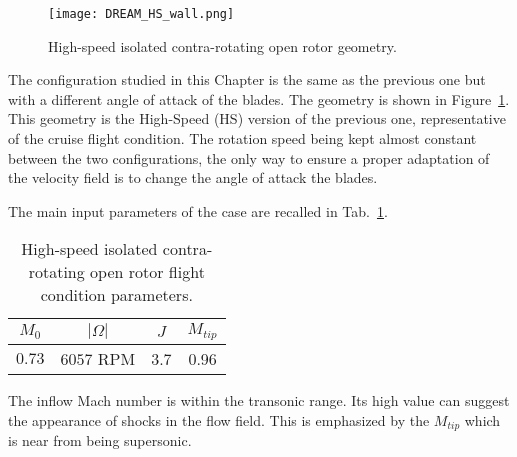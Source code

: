 
\begin{figure}[htp]
  \centering
  \texttt{[image: DREAM\_HS\_wall.png]}
  \caption{High-speed isolated contra-rotating open rotor geometry.}
  \label{fig:dream_hs_wall}
\end{figure}

The configuration studied in this Chapter is the same as the
previous one but with a different angle of attack of
the blades. The geometry is shown in Figure~\ref{fig:dream_hs_wall}.
This geometry is the High-Speed (HS) version of the previous one, 
representative of the cruise flight condition. The rotation speed being kept
almost constant between the two configurations, the only way to ensure
a proper adaptation of the velocity field is to change the angle of 
attack the blades.

The main input parameters of the case are recalled in
Tab.~\ref{tab:dream_hs_flight_condition}.
\begin{table}[htp]
   \centering
  \begin{tabular}{cccc}
    \toprule
    $M_0$ & $|\Omega|$ & $J$ & $M_{tip}$ \\
    \midrule
    $0.73$ & $6057$ RPM & 3.7 & 0.96  \\
    \bottomrule
  \end{tabular}
  \caption{High-speed isolated contra-rotating open rotor flight condition parameters.}
  \label{tab:dream_hs_flight_condition}
\end{table} 
The inflow Mach number is within the transonic range. Its high value
can suggest the appearance of shocks in the flow field. 
This is emphasized by the $M_{tip}$ which is
near from being supersonic.
